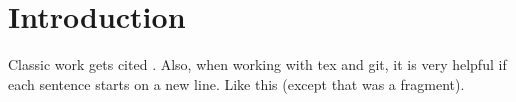 \section{Introduction}

Classic work gets cited \citep{stebbins1957}.
Also, when working with tex and git, it is very helpful if each sentence starts on a new line.
Like this (except that was a fragment).
